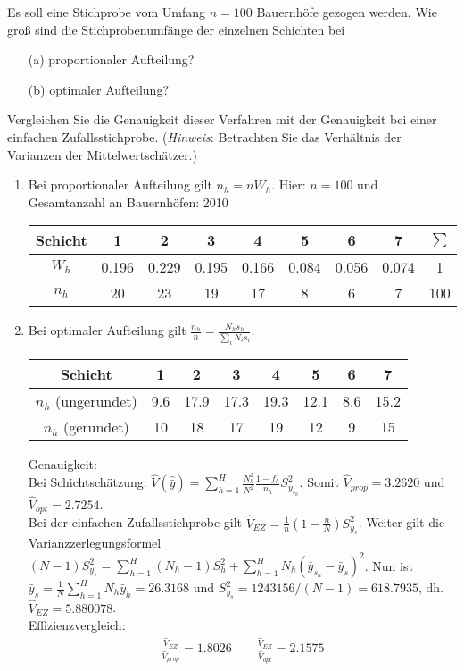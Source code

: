 \documentclass{article}
\begin{document}
Es soll eine Stichprobe vom Umfang $n=100$ Bauernhöfe gezogen werden.
Wie groß sind die Stichprobenumfänge der einzelnen Schichten bei
\begin{enumerate}
	\item[(a)] proportionaler Aufteilung?
	\item[(b)] optimaler Aufteilung?
\end{enumerate}
Vergleichen Sie die Genauigkeit dieser Verfahren mit der Genauigkeit bei einer einfachen Zufallsstichprobe.
(\textit{Hinweis}: Betrachten Sie das Verhältnis der Varianzen der Mittelwertschätzer.)
\begin{solution}
\begin{enumerate}
	\item Bei proportionaler Aufteilung gilt $n_h = n W_h$. Hier: $n=100$ und Gesamtanzahl an Bauernhöfen: 2010
	\begin{center}
	\begin{tabular}{|c|c|c|c|c|c|c|c|c|}
		\hline 
		Schicht & 1 & 2 & 3 & 4 & 5 & 6 & 7 & $\sum$ \\ 
		\hline 
		$W_h$ & 0.196 & 0.229 & 0.195 & 0.166 & 0.084 & 0.056 & 0.074 & 1 \\ 
		\hline 
		$n_h$ & 20 & 23 & 19 & 17 & 8 & 6 & 7 & 100 \\ 
		\hline 
	\end{tabular}
	\end{center}
	\item Bei optimaler Aufteilung gilt $\frac{n_h}{n} = \frac{N_h s_h}{\sum_i N_i s_i}$.
\begin{center}
	\begin{tabular}{|c|c|c|c|c|c|c|c|}
		\hline 
		Schicht & 1 & 2 & 3 & 4 & 5 & 6 & 7\\ 
		\hline 
		$n_h$ (ungerundet)	& 9.6 & 17.9 & 17.3 & 19.3 & 12.1 & 8.6 & 15.2\\ 
		\hline 
		$n_h$ (gerundet) & 10 & 18 & 17 & 19 & 12 & 9 & 15\\ 
		\hline 
	\end{tabular}
\end{center}
Genauigkeit:\\
Bei Schichtschätzung: $\hat{V}(\hat{\bar{y}}) = \sum_{h=1}^H \frac{N_h^2}{N^2}\frac{1-f_h}{n_h}S_{y_{s_h}}^2$. Somit
$\hat{V}_{prop}=3.2620$ und $\hat{V}_{opt} = 2.7254$.\\
Bei der einfachen Zufallsstichprobe gilt $\hat{V}_{EZ} = \frac{1}{n}\left(1-\frac{n}{N}\right) S_{y_s}^2$. Weiter gilt die Varianzzerlegungsformel $(N-1)S_{y_s}^2 = \sum_{h=1}^H (N_h-1)S_h^2 + \sum_{h=1}^H N_h (\bar{y}_{s_h}-\bar{y}_s)^2$. Nun ist $\bar{y}_s=\frac{1}{N}\sum_{h=1}^H N_h \bar{y}_h = 26.3168$ und $S_{y_s}^2 = 1243156/(N-1) = 618.7935$, dh. $\hat{V}_{EZ} = 5.880078$.\\
Effizienzvergleich:
\begin{align*}
\frac{\hat{V}_{EZ}}{\hat{V}_{prop}} = 1.8026 \qquad
\frac{\hat{V}_{EZ}}{\hat{V}_{opt}} = 2.1575
\end{align*}

\end{enumerate}
\end{solution}
\end{document}
